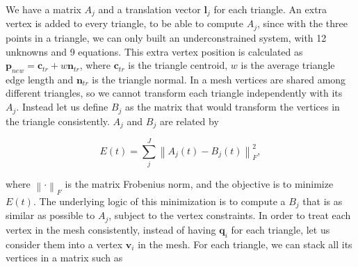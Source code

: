 \documentclass[12pt]{article}
\begin{document}
We have a matrix $A_{j}$ and a translation vector $\mathbf{l}_j$ for each triangle.
An extra vertex is added to every triangle, to be able to compute $A_j$, since with the three points in a triangle, we can only built an underconstrained system, with 12 unknowns and 9 equations.
This extra vertex position is calculated as $\mathbf{p}_{new} = \mathbf{c}_{tr} + w\mathbf{n}_{tr}$, where $\mathbf{c}_{tr}$ is the triangle centroid, $w$ is the average triangle edge length and $\mathbf{n}_{tr}$ is the triangle normal. 
In a mesh vertices are shared among different triangles, so we cannot transform each triangle independently with its $A_j$.
Instead let us define $B_{j}$ as the matrix that would transform the vertices in the triangle consistently.
$A_j$ and $B_j$ are related by

\begin{equation*}
E(t) = \sum_{j}^J \left \| A_j(t) - B_j(t) \right \|^2_F,
\end{equation*}

where $\left \| \cdot \right \|_F$ is the matrix Frobenius norm, and the objective is to minimize $E(t)$.
The underlying logic of this minimization is to compute a $B_j$ that is as similar as possible to $A_j$, subject to the vertex constraints.
In order to treat each vertex in the mesh consistently, instead of having $\mathbf{q}_i$ for each triangle, let us consider them into a vertex $\mathbf{v}_i$ in the mesh.
For each triangle, we can stack all its vertices in a matrix such as
\end{document}
